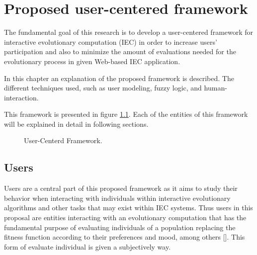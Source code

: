 	\chapter{Proposed user-centered framework}

The fundamental goal of this research is to develop a user-centered framework
for interactive evolutionary computation (IEC) in order to increase users’
participation and also to minimize the amount of evaluations needed for the
evolutionary process in given Web-based IEC application.

In this chapter an explanation of the proposed framework is described. The
different techniques used, such as user modeling, fuzzy logic, and human-
interaction.

This framework is presented in figure \ref{fig:uc_framework}. Each of the
entities of this framework will be explained in detail in following sections.

\begin{figure}
	\captionsetup{justification=centering,margin=2cm}
	\centering
	\setlength\fboxsep{0pt}
	\setlength\fboxrule{0.7pt}
	\caption{User-Centerd Framework.}
	\label{fig:uc_framework}
\end{figure}

\section{Users}

Users are a central part of this proposed framework as it aims to study their
behavior when interacting with individuals within interactive evolutionary
algorithms and other tasks that may exist within IEC systems. Thus users in
this proposal are entities interacting with an evolutionary computation that
has the fundamental purpose of evaluating individuals of a population
replacing the fitness function according to their preferences and mood, among
others []. This form of evaluate individual is given a subjectively way.

